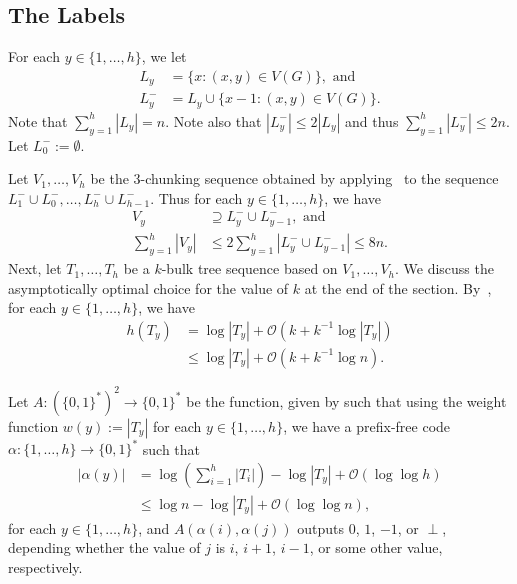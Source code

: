 \documentclass[kpfonts]{patmorin}
\newcommand{\Oh}{\mathcal{O}}
\let\le\leqslant
\let\leq\leqslant
\begin{document}
\subsection{The Labels}

For each $y\in\{1,\ldots,h\}$, we let
\begin{align*}
L_y&=\{x:(x,y)\in V(G)\}, \textrm{ and}\\
L^-_y&=L_y\cup\{x-1:(x,y)\in V(G)\}.
\end{align*}
Note that $\sum_{y=1}^h |L_y| = n$.
Note also that $|L^-_y|\le 2|L_y|$ and thus $\sum_{y=1}^h |L^-_y|\le 2n$.
Let $L^-_0:=\emptyset$.

Let $V_1,\ldots,V_{h}$ be the $3$-chunking sequence obtained by applying~ to the sequence $L^-_{1}\cup L^-_{0},\ldots,L^-_{h}\cup L^-_{h-1}$.
Thus for each $y\in\{1,\ldots,h\}$, we have
\begin{align*}
V_y&\supseteq L^-_{y}\cup L^-_{y-1}, \textrm{ and}\\
\textstyle\sum_{y=1}^h |V_y|&\le 2\textstyle\sum_{y=1}^h |L^-_{y}\cup L^-_{y-1}|\leq 8n.
\end{align*}
Next, let $T_1,\ldots,T_h$ be a $k$-bulk tree sequence based on $V_1,\ldots,V_{h}$.
We discuss the asymptotically optimal choice for the value of $k$ at the end of the section.
By~, for each $y\in\{1,\ldots,h\}$, we have
\begin{align*}
h(T_y)&=\log|T_y| + \Oh(k+k^{-1}\log |T_y|)\\
&\leq\log|T_y| + \Oh(k+k^{-1}\log n).
\end{align*}


Let $A:(\{0,1\}^{*})^2\to\{0,1\}^*$ be the function, given by  such that
using the weight function $w(y):=|T_y|$ for each $y\in\{1,\ldots,h\}$,
we have a prefix-free code $\alpha:\{1,\ldots,h\}\to\{0,1\}^*$ such that
\begin{align*}
|\alpha(y)|&=\log\left(\textstyle\sum_{i=1}^h|T_i|\right) - \log|T_y| + \Oh(\log\log h)\\
&\leq \log n - \log|T_y| + \Oh(\log\log n),
\end{align*}
for each $y\in\{1,\ldots,h\}$, and $A(\alpha(i),\alpha(j))$ outputs $0$, $1$, $-1$, or $\perp$, depending whether the value of $j$ is $i$, $i+1$, $i-1$, or some other value, respectively.
\end{document}
